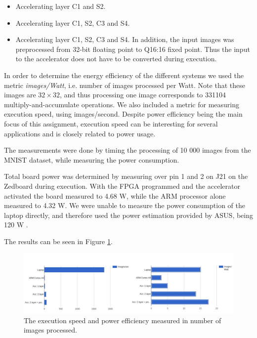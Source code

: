 \begin{itemize}
	\item Accelerating layer C1 and S2. 
	\item Accelerating layer C1, S2, C3 and S4.
	\item Accelerating layer C1, S2, C3 and S4. In addition, the input images was preprocessed from 32-bit floating point to Q16:16 fixed point. Thus the input to the accelerator does not have to be converted during execution.
\end{itemize}

In order to determine the energy efficiency of the different systems we used the metric \textit{images/Watt}, i.e. number of images processed per Watt. Note that these images are $ 32 \times 32 $, and thus processing one image corresponds to 331104 multiply-and-accumulate operations. We also included a metric for measuring execution speed, using images/second. Despite power efficiency being the main focus of this assignment, execution speed can be interesting for several applications and is closely related to power usage. 

The measurements were done by timing the processing of 10 000 images from the MNIST dataset, while measuring the power consumption. 

Total board power was determined by measuring over pin 1 and 2 on J21 on the Zedboard during execution. With the FPGA programmed and the accelerator activated the board measured to 4.68 W, while the ARM processor alone measured to 4.32 W. We were unable to measure the power consumption of the laptop directly, and therefore used the power estimation provided by ASUS, being 120 W \cite{ASUS2015}.  

The results can be seen in Figure \ref{fig_results_all_layers}.

\begin{figure}[h!]
	\centering
	\includegraphics[width=1.0\textwidth]{Figures/Results/results_all_layers}
	\caption{The execution speed and power efficiency measured in number of images processed.}
	\label{fig_results_all_layers}
\end{figure}

